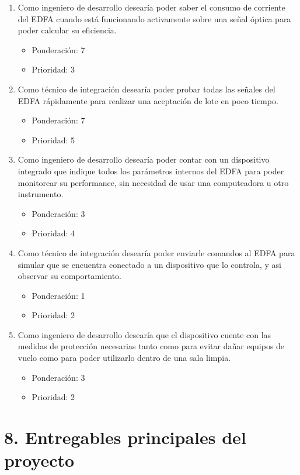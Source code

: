 \documentclass[
11pt, %
]{charter}
\begin{document}
\begin{enumerate}
	\item Como ingeniero de desarrollo desearía poder saber el consumo de corriente del EDFA cuando está funcionando activamente sobre una señal óptica para poder calcular su eficiencia.
	\begin{itemize}
		\item Ponderación: 7
		\item Prioridad: 3
	\end{itemize}
	\item Como técnico de integración desearía poder probar todas las señales del EDFA rápidamente para realizar una aceptación de lote en poco tiempo.
	\begin{itemize}
		\item Ponderación: 7
		\item Prioridad: 5
	\end{itemize}
	\item Como ingeniero de desarrollo desearía poder contar con un dispositivo integrado que indique todos los parámetros internos del EDFA para poder monitorear su performance, sin necesidad de usar una computeadora u otro instrumento.
	\begin{itemize}
		\item Ponderación: 3
		\item Prioridad: 4
	\end{itemize}
	\item Como técnico de integración desearía poder enviarle comandos al EDFA para simular que se encuentra conectado a un dispositivo que lo controla, y asi observar su comportamiento.
	\begin{itemize}
		\item Ponderación: 1
		\item Prioridad: 2
	\end{itemize}
	\item Como ingeniero de desarrollo desearía que el dispositivo cuente con las medidas de protección necesarias tanto como para evitar dañar equipos de vuelo como para poder utilizarlo dentro de una sala limpia.
	\begin{itemize}
		\item Ponderación: 3
		\item Prioridad: 2
	\end{itemize}
\end{enumerate}

\section{8. Entregables principales del proyecto}
\label{sec:entregables}
\end{document}
